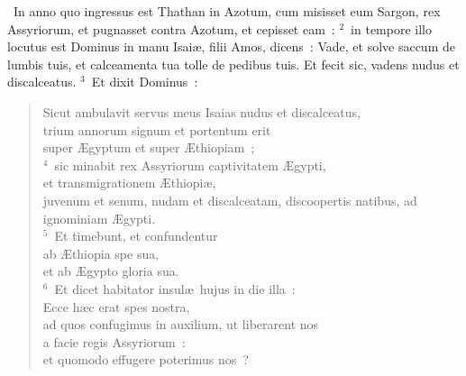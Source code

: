 ~In anno quo ingressus est Thathan in Azotum, cum misisset eum Sargon, rex Assyriorum, et pugnasset contra Azotum, et cepisset eam~:
${}^{2}$~in tempore illo locutus est Dominus in manu Isai\ae , filii Amos, dicens~: Vade, et solve saccum de lumbis tuis, et calceamenta tua tolle de pedibus tuis. Et fecit sic, vadens nudus et discalceatus.
${}^{3}$~Et dixit Dominus~: \begin{flushleft}\begin{verse}Sicut ambulavit servus meus Isaias nudus et discalceatus,\\ trium annorum signum et portentum erit\\ super \AE gyptum et super \AE thiopiam~;\\
${}^{4}$~sic minabit rex Assyriorum captivitatem \AE gypti,\\ et transmigrationem \AE thiopi\ae ,\\ juvenum et senum, nudam et discalceatam, discoopertis natibus, ad ignominiam \AE gypti.\\
${}^{5}$~Et timebunt, et confundentur\\ ab \AE thiopia spe sua,\\ et ab \AE gypto gloria sua.\\
${}^{6}$~Et dicet habitator insul\ae\ hujus in die illa~:\\ Ecce h\ae c erat spes nostra,\\ ad quos confugimus in auxilium, ut liberarent nos\\ a facie regis Assyriorum~:\\ et quomodo effugere poterimus nos~?\end{verse}\end{flushleft}


